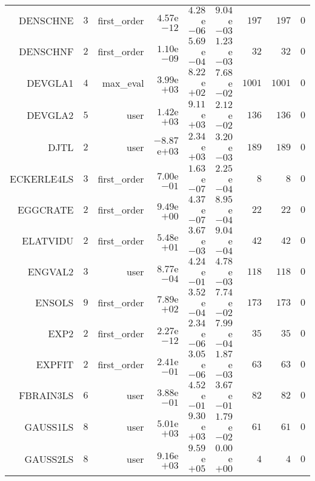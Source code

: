 \begin{longtable}{rrrrrrrrr}
DENSCHNE & \(     3\) & first\_order & \( 4.57\)e\(-12\) & \( 4.28\)e\(-06\) & \( 9.04\)e\(-03\) & \(   197\) & \(   197\) & \(     0\) \\
DENSCHNF & \(     2\) & first\_order & \( 1.10\)e\(-09\) & \( 5.69\)e\(-04\) & \( 1.23\)e\(-03\) & \(    32\) & \(    32\) & \(     0\) \\
DEVGLA1 & \(     4\) & max\_eval & \( 3.99\)e\(+03\) & \( 8.22\)e\(+02\) & \( 7.68\)e\(-02\) & \(  1001\) & \(  1001\) & \(     0\) \\
DEVGLA2 & \(     5\) & user & \( 1.42\)e\(+03\) & \( 9.11\)e\(+03\) & \( 2.12\)e\(-02\) & \(   136\) & \(   136\) & \(     0\) \\
DJTL & \(     2\) & user & \(-8.87\)e\(+03\) & \( 2.34\)e\(+03\) & \( 3.20\)e\(-03\) & \(   189\) & \(   189\) & \(     0\) \\
ECKERLE4LS & \(     3\) & first\_order & \( 7.00\)e\(-01\) & \( 1.63\)e\(-07\) & \( 2.25\)e\(-04\) & \(     8\) & \(     8\) & \(     0\) \\
EGGCRATE & \(     2\) & first\_order & \( 9.49\)e\(+00\) & \( 4.37\)e\(-07\) & \( 8.95\)e\(-04\) & \(    22\) & \(    22\) & \(     0\) \\
ELATVIDU & \(     2\) & first\_order & \( 5.48\)e\(+01\) & \( 3.67\)e\(-03\) & \( 9.04\)e\(-04\) & \(    42\) & \(    42\) & \(     0\) \\
ENGVAL2 & \(     3\) & user & \( 8.77\)e\(-04\) & \( 4.24\)e\(-01\) & \( 4.78\)e\(-03\) & \(   118\) & \(   118\) & \(     0\) \\
ENSOLS & \(     9\) & first\_order & \( 7.89\)e\(+02\) & \( 3.52\)e\(-04\) & \( 7.74\)e\(-02\) & \(   173\) & \(   173\) & \(     0\) \\
EXP2 & \(     2\) & first\_order & \( 2.27\)e\(-12\) & \( 2.34\)e\(-06\) & \( 7.99\)e\(-04\) & \(    35\) & \(    35\) & \(     0\) \\
EXPFIT & \(     2\) & first\_order & \( 2.41\)e\(-01\) & \( 3.05\)e\(-06\) & \( 1.87\)e\(-03\) & \(    63\) & \(    63\) & \(     0\) \\
FBRAIN3LS & \(     6\) & user & \( 3.88\)e\(-01\) & \( 4.52\)e\(-01\) & \( 3.67\)e\(-01\) & \(    82\) & \(    82\) & \(     0\) \\
GAUSS1LS & \(     8\) & user & \( 5.01\)e\(+03\) & \( 9.30\)e\(+03\) & \( 1.79\)e\(-02\) & \(    61\) & \(    61\) & \(     0\) \\
GAUSS2LS & \(     8\) & user & \( 9.16\)e\(+03\) & \( 9.59\)e\(+05\) & \( 0.00\)e\(+00\) & \(     4\) & \(     4\) & \(     0\) \\

\end{longtable}

